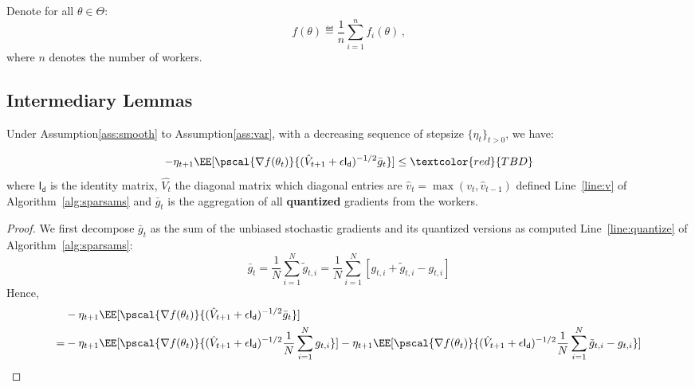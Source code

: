\documentclass[11pt]{article}
\begin{document}
Denote for all $\theta \in \Theta$:
\begin{equation}\label{eq:obj}
f(\theta) \eqdef  \frac{1}{n} \sum_{i=1}^n f_i(\theta) \, ,
\end{equation} 
where $n$ denotes the number of workers.



\subsection{Intermediary Lemmas}

\begin{Lemma}
Under Assumption\ref{ass:smooth} to Assumption\ref{ass:var}, with a decreasing sequence of stepsize $\{\eta_t\}_{t>0}$, we have:

\begin{equation}
-\eta_{t+1}\EE[\pscal{\nabla f(\theta_t)}{(\hat{V}_{t+1} + \epsilon \mathsf{I_d})^{-1/2} \bar{g}_t}] \leq \textcolor{red}{TBD}
\end{equation}
where $ \mathsf{I_d}$ is the identity matrix, $\hat{V_t}$ the diagonal matrix which diagonal entries are $\hat v_t=\max(v_t,\hat v_{t-1})$ defined Line~\ref{line:v} of Algorithm~\ref{alg:sparsams} and $\bar{g}_t$ is the aggregation of all \textbf{quantized} gradients from the workers.
\end{Lemma}



\begin{proof}
We first decompose $\bar{g}_t$  as the sum of the unbiased stochastic gradients and its quantized versions as computed Line~\ref{line:quantize} of Algorithm~\ref{alg:sparsams}:
\begin{equation}
\bar{g}_t = \frac{1}{N}\sum_{i=1}^N \tilde g_{t,i} = \frac{1}{N}\sum_{i=1}^N [ g_{t,i} + \tilde g_{t,i} - g_{t,i}]
\end{equation}
Hence,
\begin{equation}
\begin{split}
& -\eta_{t+1}\EE[\pscal{\nabla f(\theta_t)}{(\hat{V}_{t+1} + \epsilon \mathsf{I_d})^{-1/2} \bar{g}_t}] \\
=  & -\eta_{t+1}\EE[\pscal{\nabla f(\theta_t)}{(\hat{V}_{t+1} + \epsilon \mathsf{I_d})^{-1/2} \frac{1}{N}\sum_{i=1}^N  g_{t,i}} ] -\eta_{t+1}\EE[\pscal{\nabla f(\theta_t)}{(\hat{V}_{t+1} + \epsilon \mathsf{I_d})^{-1/2} \frac{1}{N}\sum_{i=1}^N  \tilde g_{t,i} - g_{t,i}}]
\end{split}
\end{equation}
\end{proof}
\end{document}
